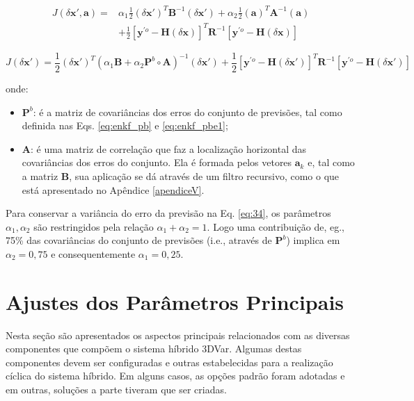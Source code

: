\begin{equation}
\label{eq:33}
\begin{aligned}
J(\delta{\mathbf{x}'},\mathbf{a}) = {} & \alpha_{1} \frac{1}{2} (\delta{\mathbf{x}'})^{T}\mathbf{B}^{-1}(\delta{\mathbf{x}'}) + \alpha_{2} \frac{1}{2} (\mathbf{a})^{T}\mathbf{A}^{-1}(\mathbf{a}) \\
& + \frac{1}{2} [{\mathbf{y}}^{\prime{o}} - \mathbf{H}(\delta{\mathbf{x}})]^{T}\mathbf{R}^{-1}[{\mathbf{y}}^{\prime{o}} - \mathbf{H}(\delta{\mathbf{x}})]
\end{aligned}
\end{equation}

\begin{equation}
\label{eq:34}
J(\delta{\mathbf{x}'}) = \frac{1}{2} (\delta{\mathbf{x}'})^{T} (\alpha_{1}\mathbf{B}+\alpha_{2}\mathbf{P}^{b}\circ\mathbf{A})^{-1} (\delta{\mathbf{x}'}) + \frac{1}{2} [{\mathbf{y}}^{\prime{o}} - \mathbf{H}(\delta{\mathbf{x}'})]^{T}\mathbf{R}^{-1}[{\mathbf{y}}^{\prime{o}} - \mathbf{H}(\delta{\mathbf{x}'})]
\end{equation}

onde:

\begin{itemize}
    \item $\mathbf{P}^{b}$: é a matriz de covariâncias dos erros do conjunto de previsões, tal como definida nas Eqs. \ref{eq:enkf_pb} e \ref{eq:enkf_pbe1};
    \item $\mathbf{A}$: é uma matriz de correlação que faz a localização horizontal das covariâncias dos erros do conjunto. Ela é formada pelos vetores $\mathbf{a}_{k}$ e, tal como a matriz $\mathbf{B}$, sua aplicação se dá através de um filtro recursivo, como o que está apresentado no Apêndice \ref{apendiceV}.
\end{itemize}

Para conservar a variância do erro da previsão na Eq. \ref{eq:34}, os parâmetros $\alpha_{1}, \alpha_{2}$ são restringidos pela relação $\alpha_{1} + \alpha_{2} = 1$. Logo uma contribuição de, eg., 75\% das covariâncias do conjunto de previsões (i.e., através de $\mathbf{P}^{b}$) implica em $\alpha_{2}=0,75$ e consequentemente $\alpha_{1}=0,25$.

\section{Ajustes dos Parâmetros Principais}

Nesta seção são apresentados os aspectos principais relacionados com as diversas componentes que compõem o sistema híbrido 3DVar. Algumas destas componentes devem ser configuradas e outras estabelecidas para a realização cíclica do sistema híbrido. Em alguns casos, as opções padrão foram adotadas e em outras, soluções a parte tiveram que ser criadas. %

